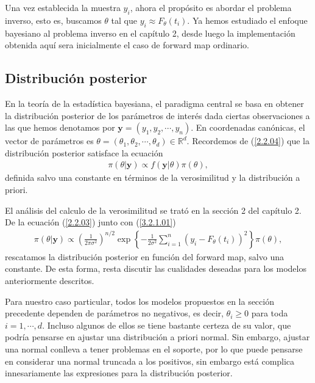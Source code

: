 Una vez establecida la muestra $y_i$, ahora el propósito es abordar el problema inverso, esto es, buscamos $\theta$ tal que $y_i \approx F_{\theta}(t_i)$. Ya hemos estudiado el enfoque bayesiano al problema inverso en el capítulo 2, desde luego la implementación obtenida aquí sera inicialmente el caso de forward map ordinario.

\subsection{Distribución posterior}

En la teoría de la estadística bayesiana, el paradigma central se basa en obtener la distribución posterior de los parámetros de interés dada ciertas observaciones a las que hemos denotamos por $\mathbf{y} = (y_1,y_2,\cdots, y_n)$. 
En coordenadas canónicas, el vector de parámetros es $\theta = (\theta_1,\theta_2, \cdots, \theta_d) \in \mathbb{R}^d$. Recordemos de (\ref{2.2.04}) que la distribución posterior satisface la ecuación  
\begin{align}
    \pi(\theta|\mathbf{y}) \propto f(\mathbf{y}|\theta) \pi(\theta),
    \label{3.2.1.01}
\end{align} 
definida salvo una constante en términos de la verosimilitud y la distribución a priori. 

El análisis del calculo de la verosimilitud se trató en la sección 2 del capítulo 2. De la ecuación (\ref{2.2.03}) junto con (\ref{3.2.1.01})
\begin{align}
    \pi(\theta|\mathbf{y}) \propto \left(\frac{1}{2\pi \sigma^2}\right) ^{n/2}\exp \left \{  -\frac{1}{2\sigma^2}\sum_{i = 1}^{n} \left(y_i - F_{\theta}(t_i)\right)^2 \right \} \pi(\theta),
    \label{3.2.1.02}
\end{align}
rescatamos la distribución posterior en función del forward map, salvo una constante. De esta forma, resta discutir las cualidades deseadas para los modelos anteriormente descritos.

Para nuestro caso particular, todos los modelos propuestos en la sección precedente dependen de parámetros no negativos, es decir, $\theta_i \geq 0$ para toda $i = 1,\cdots, d$. Incluso algunos de ellos se tiene bastante certeza de su valor, que podría pensarse en ajustar una distribución a priori normal. Sin embargo, ajustar una normal conlleva a tener problemas en el soporte, por lo que puede pensarse en considerar una normal truncada a los positivos, sin embargo está complica innesariamente las expresiones para la distribución posterior. 

